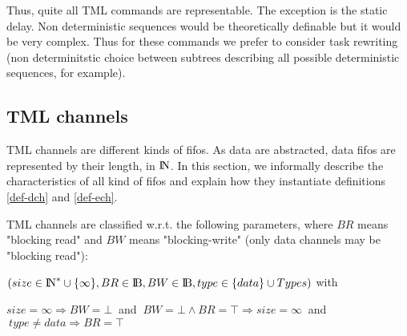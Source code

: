 \documentclass{article}
\newcommand{\NAT}{\mbox{\normalfont I$\!$N}}
\newcommand{\BOOL}{\mbox{\normalfont I$\!$B}}
\begin{document}
Thus, quite all TML commands are representable. The exception is the static delay. Non deterministic sequences would be theoretically definable but it would be very complex. Thus for these commands we prefer to consider task rewriting (non determinitstic choice between  subtrees describing all possible deterministic sequences, for example).

\subsection{TML channels}
TML channels are different kinds of fifos. As data are abstracted, data fifos are represented by their length, in $\NAT$. In this section, we informally describe the characteristics of all kind of fifos and explain how they instantiate definitions \ref{def-dch} and \ref{def-ech}.

TML channels are classified w.r.t. the following parameters, where $BR$ means "blocking read" and $BW$ means "blocking-write" (only data channels may be "blocking read"):

\hspace*{2.5cm} $(size\in\NAT^*\cup\{\infty\},BR\in \BOOL,BW\in\BOOL,type\in\{data\}\cup
Types)$ with

\hspace*{1cm} $size=\infty\Rightarrow BW=\bot~$ and $~BW=\bot\wedge BR=\top\Rightarrow size=\infty~$ and $~type\neq data\Rightarrow BR=\top$
\end{document}
